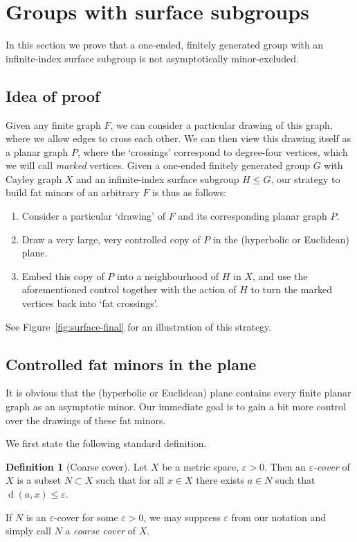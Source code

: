 \documentclass[10pt,a4paper]{amsart}
\DeclareMathOperator{\dist}{d}
\theoremstyle{definition}
\newtheorem{definition}[theorem]{Definition}
\begin{document}
\section{Groups with surface subgroups}\label{sec:plane}

In this section we prove that a one-ended, finitely generated group with an infinite-index surface subgroup is not asymptotically minor-excluded. 

\subsection{Idea of proof}

Given any finite graph $F$, we can consider a particular drawing of this graph, where we allow edges to cross each other. We can then view this drawing itself as a planar graph $P$, where the `crossings' correspond to degree-four vertices, which we will call \textit{marked} vertices.
Given a one-ended finitely generated group $G$ with Cayley graph $X$ and an infinite-index surface subgroup $H \leq G$, our strategy to build fat minors of an arbitrary $F$ is thus as follows:
\begin{enumerate}
	\item Consider a particular `drawing' of $F$ and its corresponding planar graph $P$. 
	\item Draw a very large, very controlled copy of $P$ in the (hyperbolic or Euclidean) plane. 
	\item Embed this copy of $P$ into a neighbourhood of $H$ in $X$, and use the aforementioned control together with the action of $H$ to turn the marked vertices back into `fat crossings'. 
\end{enumerate}
See Figure~\ref{fig:surface-final} for an illustration of this strategy. 


\subsection{Controlled fat minors in the plane}



It is obvious that the (hyperbolic or Euclidean) plane contains every finite planar graph as an asymptotic minor. Our immediate goal is to gain a bit more control over the drawings of these fat minors. 

We first state the following standard definition. 

\begin{definition}[Coarse cover]
    Let $X$ be a metric space, $\varepsilon > 0$. Then an \textit{$\varepsilon$-cover} of $X$ is a subset $N \subset X$ such that for all $x \in X$ there exists $a \in N$ such that $\dist(a,x) \leq \varepsilon$. 

    If $N$ is an $\varepsilon$-cover for some $\varepsilon > 0$, we may suppress $\varepsilon$ from our notation and simply call $N$ a \textit{coarse cover} of $X$. 
\end{definition}
\end{document}
